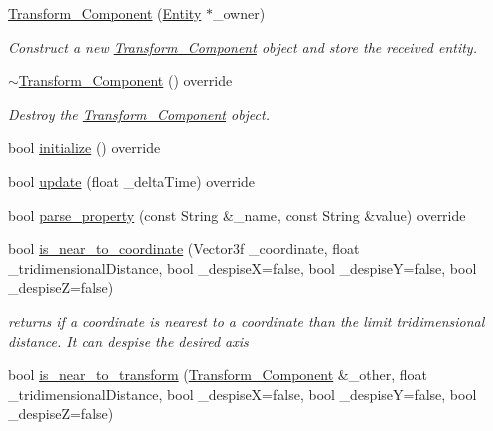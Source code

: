 \begin{DoxyCompactItemize}
\item 
\mbox{\hyperlink{classbanita_1_1_transform___component_af0df15865b1b3576bae0fa9cbdce2669}{Transform\+\_\+\+Component}} (\mbox{\hyperlink{classbanita_1_1_entity}{Entity}} $\ast$\+\_\+owner)
\begin{DoxyCompactList}\small\item\em Construct a new \mbox{\hyperlink{classbanita_1_1_transform___component}{Transform\+\_\+\+Component}} object and store the received entity. \end{DoxyCompactList}\item 
\mbox{\hyperlink{classbanita_1_1_transform___component_a87e6794c494fefc601ed15c84eaff97c}{$\sim$\+Transform\+\_\+\+Component}} () override
\begin{DoxyCompactList}\small\item\em Destroy the \mbox{\hyperlink{classbanita_1_1_transform___component}{Transform\+\_\+\+Component}} object. \end{DoxyCompactList}\item 
bool \mbox{\hyperlink{classbanita_1_1_transform___component_af21e03166cba2a8489b2a5e02867ce6a}{initialize}} () override
\item 
bool \mbox{\hyperlink{classbanita_1_1_transform___component_a0ca137a40cc84ee0825f37bab82d5d5d}{update}} (float \+\_\+delta\+Time) override
\item 
bool \mbox{\hyperlink{classbanita_1_1_transform___component_a0f3ace424235b3992e01dbddfe85f088}{parse\+\_\+property}} (const String \&\+\_\+name, const String \&value) override
\item 
bool \mbox{\hyperlink{classbanita_1_1_transform___component_a5299c227977c6efd87cc83af7c357a71}{is\+\_\+near\+\_\+to\+\_\+coordinate}} (Vector3f \+\_\+coordinate, float \+\_\+tridimensional\+Distance, bool \+\_\+despiseX=false, bool \+\_\+despiseY=false, bool \+\_\+despiseZ=false)
\begin{DoxyCompactList}\small\item\em returns if a coordinate is nearest to a coordinate than the limit tridimensional distance. It can despise the desired axis \end{DoxyCompactList}\item 
bool \mbox{\hyperlink{classbanita_1_1_transform___component_a376479ef59304837ff6cd5fb50f55058}{is\+\_\+near\+\_\+to\+\_\+transform}} (\mbox{\hyperlink{classbanita_1_1_transform___component}{Transform\+\_\+\+Component}} \&\+\_\+other, float \+\_\+tridimensional\+Distance, bool \+\_\+despiseX=false, bool \+\_\+despiseY=false, bool \+\_\+despiseZ=false)

\end{DoxyCompactItemize}
